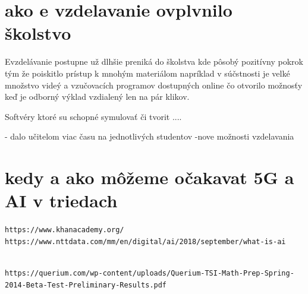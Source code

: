 \documentclass[10pt,oneside,slovak,a4paper]{article}
\begin{document}
\section{ako e vzdelavanie ovplvnilo školstvo}
Evzdelávanie postupne už dlhšie preniká do školstva kde pôsobý pozitívny pokrok tým že poiskitlo prístup k mnohým materiálom napríklad v súčstnosti je velké množstvo videý a vzučovacích programov dostupných online čo otvorilo možnosťy keď je odborný výklad vzdialený len na pár klikov. 

Softvéry ktoré su schopné symulovať či tvorit ....\cite{10.1145/3399971.3399984}


- dalo učitelom viac času na jednotlivých studentov 
-nove možnosti vzdelavania 

\section{kedy a ako môžeme očakavat 5G a AI v triedach}






	
\label{khanacademy} 
\texttt{https://www.khanacademy.org/}
\\
\label{AI} 
\texttt{https://www.nttdata.com/mm/en/digital/ai/2018/september/what-is-ai}
\date{22.11.2020}
\\
\label{querium_report}
\texttt{https://querium.com/wp-content/uploads/Querium-TSI-Math-Prep-Spring-2014-Beta-Test-Preliminary-Results.pdf}

	
	
\end{document}
